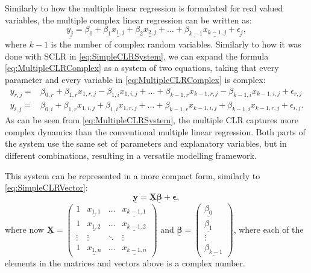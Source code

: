 \documentclass[
]{book}
\begin{document}
Similarly to how the multiple linear regression is formulated for real valued variables, the multiple complex linear regression can be written as:
\begin{equation}
    \underline{y_j} = \underline{\beta_0} + \underline{\beta_1} \underline{x_{1,j}} + \underline{\beta_2} \underline{x_{2,j}} + \dots + \underline{\beta_{k-1}} \underline{x_{k-1,j}} + \underline{\epsilon_j},
    \label{eq:MultipleCLRComplex}
\end{equation}
where \(k-1\) is the number of complex random variables. Similarly to how it was done with SCLR in \eqref{eq:SimpleCLRSystem}, we can expand the formula \eqref{eq:MultipleCLRComplex} as a system of two equations, taking that every parameter and every variable in \eqref{eq:MultipleCLRComplex} is complex:
\begin{equation}
    \begin{aligned}
        y_{r,j} = & \beta_{0,r} + \beta_{1,r} x_{1,r,j} - \beta_{1,i} x_{1,i,j} + \dots + \beta_{k-1,r} x_{k-1,r,j} - \beta_{k-1,i} x_{k-1,i,j} + \epsilon_{r,j} \\
        y_{i,j} = & \beta_{0,i} + \beta_{1,r} x_{1,i,j} + \beta_{1,i} x_{1,r,j} + \dots + \beta_{k-1,r} x_{k-1,i,j} + \beta_{k-1,i} x_{k-1,r,j} + \epsilon_{i,j} .
    \end{aligned}
    \label{eq:MultipleCLRSystem}
\end{equation}
As can be seen from \eqref{eq:MultipleCLRSystem}, the multiple CLR captures more complex dynamics than the conventional multiple linear regression. Both parts of the system use the same set of parameters and explanatory variables, but in different combinations, resulting in a versatile modelling framework.

This system can be represented in a more compact form, similarly to \eqref{eq:SimpleCLRVector}:
\begin{equation}
    \underline{\mathbf{y}} = \underline{\mathbf{X}} \underline{\boldsymbol{\beta}} + \underline{\boldsymbol{\epsilon}} ,
    \label{eq:CLRVector}
\end{equation}
where now \(\underline{\mathbf{X}} = \begin{pmatrix} 1 & \underline{{x}_{1,1}} & \dots & \underline{{x}_{k-1,1}} \\ 1 & \underline{{x}_{1,2}} & \dots & \underline{{x}_{k-1,2}} \\ \vdots & \vdots & \ddots & \vdots \\ 1 & \underline{{x}_{1,n}} & \dots & \underline{{x}_{k-1,n}} \end{pmatrix}\) and \(\underline{\boldsymbol{\beta}} = \begin{pmatrix} \underline{{\beta}_0} \\ \underline{{\beta}_1} \\ \vdots \\ \underline{{\beta}_{k-1}} \end{pmatrix}\), where each of the elements in the matrices and vectors above is a complex number.
\end{document}
